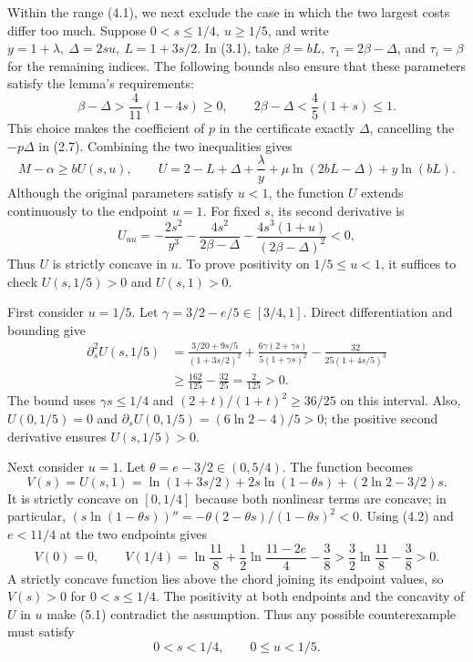\documentclass[11pt,a4paper]{article}
\begin{document}
Within the range (4.1), we next exclude the case in which the two largest costs differ too much. Suppose $0<s\le1/4,\ u\ge1/5$, and write $y=1+\lambda,\ \Delta=2su,\ L=1+3s/2$.
In (3.1), take $\beta=bL,\ \tau_1=2\beta-\Delta$, and $\tau_i=\beta$ for the remaining indices. The following bounds also ensure that these parameters satisfy the lemma's requirements:
\[
\beta-\Delta>\frac4{11}(1-4s)\ge0,\qquad
2\beta-\Delta<\frac45(1+s)\le1.
\]
This choice makes the coefficient of $p$ in the certificate exactly $\Delta$, cancelling the $-p\Delta$ in (2.7). Combining the two inequalities gives
\begin{equation}
M-\alpha\ge bU(s,u),\qquad
U=2-L+\Delta+\frac{\lambda}{y}
+\mu\ln(2bL-\Delta)+y\ln(bL).
\tag{5.1}
\end{equation}
Although the original parameters satisfy $u<1$, the function $U$ extends continuously to the endpoint $u=1$. For fixed $s$, its second derivative is
\[
U_{uu}=-\frac{2s^2}{y^3}
-\frac{4s^2}{2\beta-\Delta}
-\frac{4s^3(1+u)}{(2\beta-\Delta)^2}<0,
\]
Thus $U$ is strictly concave in $u$. To prove positivity on $1/5\le u<1$, it suffices to check $U(s,1/5)>0$ and $U(s,1)>0$.

First consider $u=1/5$. Let $\gamma=3/2-e/5\in[3/4,1]$. Direct differentiation and bounding give
\begin{equation}
\begin{aligned}
\partial_s^2U(s,1/5)
&=\frac{3/20+9s/5}{(1+3s/2)^2}
+\frac{6\gamma(2+\gamma s)}{5(1+\gamma s)^2}
-\frac{32}{25(1+4s/5)^3}\\
&\ge\frac{162}{125}-\frac{32}{25}=\frac2{125}>0.
\end{aligned}
\tag{5.2}
\end{equation}
The bound uses $\gamma s\le1/4$ and $(2+t)/(1+t)^2\ge36/25$ on this interval. Also, $U(0,1/5)=0$ and $\partial_sU(0,1/5)=(6\ln2-4)/5>0$; the positive second derivative ensures $U(s,1/5)>0$.

Next consider $u=1$. Let $\theta=e-3/2\in(0,5/4)$. The function becomes
\[
V(s)=U(s,1)=\ln(1+3s/2)+2s\ln(1-\theta s)+(2\ln2-3/2)s.
\]
It is strictly concave on $[0,1/4]$ because both nonlinear terms are concave; in particular,
$(s\ln(1-\theta s))''=-\theta(2-\theta s)/(1-\theta s)^2<0$.
Using (4.2) and $e<11/4$ at the two endpoints gives
\begin{equation}
V(0)=0,\qquad
V(1/4)=\ln\frac{11}{8}+\frac12\ln\frac{11-2e}{4}-\frac38
>\frac32\ln\frac{11}{8}-\frac38>0.
\tag{5.3}
\end{equation}
A strictly concave function lies above the chord joining its endpoint values, so $V(s)>0$ for $0<s\le1/4$. The positivity at both endpoints and the concavity of $U$ in $u$ make (5.1) contradict the assumption. Thus any possible counterexample must satisfy
\begin{equation}
0<s<1/4,\qquad0\le u<1/5.
\tag{5.4}
\end{equation}
\end{document}
